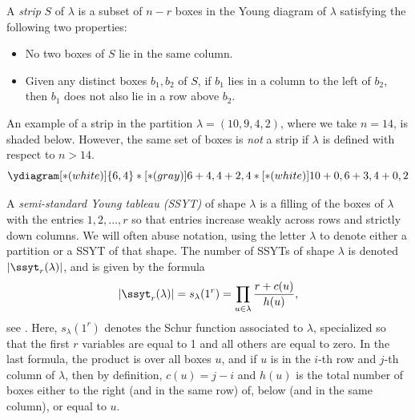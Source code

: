 A \emph{strip} $S$ of $\lambda$ is a subset of $n-r$ boxes in the Young diagram of $\lambda$ satisfying the following two properties:
\begin{itemize}
\item  No two boxes of $S$ lie in the same column.
\item Given any distinct boxes $b_1,b_2$ of $S$, if $b_1$ lies in a column to the left of $b_2$, then $b_1$ does not also lie in a row above $b_2$.
\end{itemize}
An example of a strip in the partition $\lambda=(10,9,4,2)$, where we take $n=14$, is shaded below. However, the same set of boxes is \emph{not} a strip if $\lambda$ is defined with respect to $n>14$.
%
\begin{equation*}
\ydiagram[*(white) ]
{6,4}
*[*(gray)]{6+4,4+2,4}
*[*(white)]{10+0,6+3,4+0,2}
\end{equation*}

A \emph{semi-standard Young tableau (SSYT)} of shape $\lambda$ is a filling of the boxes of $\lambda$ with the entries $1,2,\ldots,r$ so that entries increase weakly across rows and strictly down columns. We will often abuse notation, using the letter $\lambda$ to denote either a partition or a SSYT of that shape. The number of SSYTs of shape $\lambda$ is denoted $|\ssyt_r(\lambda)|$, and is given by the formula
\begin{equation*}
|\ssyt_r(\lambda)|=s_\lambda(1^r)=\prod_{u\in\lambda}\frac{r+c(u)}{h(u)},
\end{equation*}
see \cite[Corollary 7.21.4]{EC2}. Here, $s_\lambda(1^r)$ denotes the Schur function associated to $\lambda$, specialized so that the first $r$ variables are equal to 1 and all others are equal to zero. In the last formula, the product is over all boxes $u$, and if $u$ is in the $i$-th row and $j$-th column of $\lambda$, then by definition, $c(u)=j-i$ and $h(u)$ is the total number of boxes either to the right (and in the same row) of, below (and in the same column), or equal to $u$.


